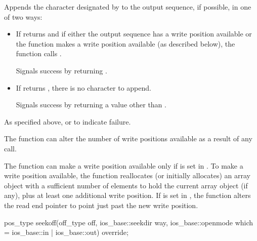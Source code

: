 \begin{itemdescr}
\pnum
\effects
Appends the character designated by  to the output
sequence, if possible, in one of two ways:
\begin{itemize}
\item
If
returns
and if either
the output sequence has a write position available or
the function makes a write position available
(as described below),
the function calls
.

Signals success by returning .

\item
If
returns
,
there is no character to append.

Signals success by returning a value other than
.
\end{itemize}

\pnum
\returns
As specified above, or
to indicate failure.

\pnum
\remarks
The function can alter the number of write positions available as a
result of any call.

\pnum
The function can make a write position available only if
 is set in .
To make a write position available,
the function reallocates (or initially allocates) an array object
with a sufficient number of elements to hold
the current array object (if any), plus
at least
one additional write position.
If  is set in ,
the function alters the read end pointer
to point just past the new write position.
\end{itemdescr}

%
\begin{itemdecl}
pos_type seekoff(off_type off, ios_base::seekdir way,
                 ios_base::openmode which
                   = ios_base::in | ios_base::out) override;
\end{itemdecl}

